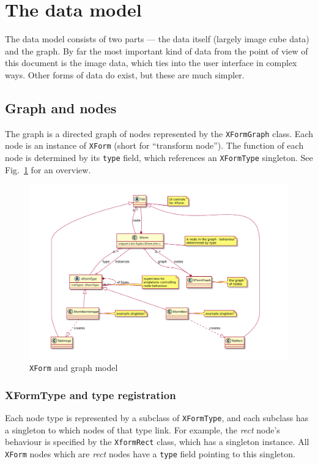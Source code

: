

\section{The data model}
The data model consists of two parts --- the data itself (largely
image cube data) and the graph. By far the most important kind of data
from the point of view of this document is the image data, which ties
into the user interface in complex ways. Other forms of data do exist,
but these are much simpler.


\subsection{Graph and nodes}
The graph is a directed graph of nodes represented by the 
\texttt{XFormGraph} class. Each node is an instance of \texttt{XForm}
(short for ``transform node''). The function of each node is
determined by its \texttt{type} field, which references an
\texttt{XFormType} singleton. See Fig.~\ref{xform.pdf} for an overview.

\begin{figure}[ht]
\center
\includegraphics[width=5in]{xform.pdf}
\caption{\texttt{XForm} and graph model}
\label{xform.pdf}
\end{figure}

\subsubsection{XFormType and type registration}
\label{xformtype}
Each node type is represented by a subclass of \texttt{XFormType},
and each subclass has a singleton to which nodes of that type link.
For example, the \emph{rect} node's behaviour is specified by
the \texttt{XformRect} class, which has a singleton instance. All
\texttt{XForm} nodes which are \emph{rect} nodes have a \texttt{type} field
pointing to this singleton.

